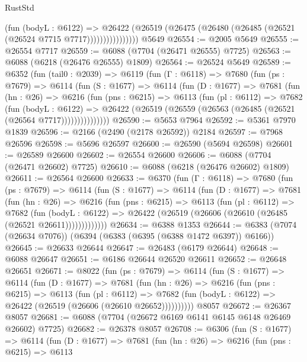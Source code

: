 \begin{lexlean}{RustStd}
\begin{coremodule}
                      (fun (bodyL : @6122) =>
                      @26422
                        (@26519 (@26475 (@26480 (@26485 (@26521 (@26524 @7715 @7717))))))))))))))))
    @5649
@26554 := @2005 @5649
@26555 := @26554 @7717
@26559 := @6088 (@7704 (@26471 @26555) @7725)
@26563 := @6088 (@6218 (@26476 @26555) @1809)
@26564 := @26524 @5649
@26589 := @6352
    (fun (tail0 : @2039) =>
    @6119
      (fun (Γ : @6118) =>
      @7680
        (fun (ps : @7679) =>
        @6114
          (fun (S : @1677) =>
          @6114
            (fun (D : @1677) =>
            @7681
              (fun (hn : @26) =>
              @6216
                (fun (pns : @6215) =>
                @6113
                  (fun (pl : @6112) =>
                  @7682
                    (fun (bodyL : @6122) =>
                    @26422 (@26519 (@26559 (@26563 (@26485 (@26521 (@26564 @7717)))))))))))))))
@26590 := @5653 @7964
@26592 := @5361 @7970 @1839
@26596 := @2166 (@2490 (@2178 @26592)) @2184
@26597 := @7968 @26596
@26598 := @5696 @26597
@26600 := @26590 (@5694 @26598)
@26601 := @26589 @26600
@26602 := @26554 @26600
@26606 := @6088 (@7704 (@26471 @26602) @7725)
@26610 := @6088 (@6218 (@26476 @26602) @1809)
@26611 := @26564 @26600
@26633 := @6370
    (fun (Γ : @6118) =>
    @7680
      (fun (ps : @7679) =>
      @6114
        (fun (S : @1677) =>
        @6114
          (fun (D : @1677) =>
          @7681
            (fun (hn : @26) =>
            @6216
              (fun (pns : @6215) =>
              @6113
                (fun (pl : @6112) =>
                @7682
                  (fun (bodyL : @6122) =>
                  @26422 (@26519 (@26606 (@26610 (@26485 (@26521 @26611)))))))))))))
@26634 := @6388 @1353
@26644 := @6383 (@7074 (@26634 @7076)) (@6394 (@6383 (@6395 (@6388 @1472 @6397)) @6166))
@26645 := @26633 @26644
@26647 := @26483 (@6179 @26644)
@26648 := @6088 @26647
@26651 := @6186 @26644 @26520 @26611
@26652 := @26648 @26651
@26671 := @8022
    (fun (ps : @7679) =>
    @6114
      (fun (S : @1677) =>
      @6114
        (fun (D : @1677) =>
        @7681
          (fun (hn : @26) =>
          @6216
            (fun (pns : @6215) =>
            @6113
              (fun (pl : @6112) =>
              @7682 (fun (bodyL : @6122) => @26422 (@26519 (@26606 (@26610 @26652))))))))))
    @8057
@26672 := @26367 @8057
@26681 := @6088 (@7704 (@26672 @6169 @6141 @6145 @6148 @26469 @26602) @7725)
@26682 := @26378 @8057
@26708 := @6306
    (fun (S : @1677) =>
    @6114
      (fun (D : @1677) =>
      @7681
        (fun (hn : @26) =>
        @6216
          (fun (pns : @6215) =>
          @6113

\end{coremodule}
\end{lexlean}
